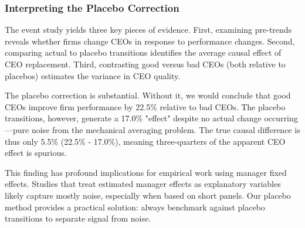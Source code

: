 \documentclass[11pt,a4paper]{article}
\begin{document}
\subsubsection{Interpreting the Placebo Correction}

The event study yields three key pieces of evidence. First, examining pre-trends reveals whether firms change CEOs in response to performance changes. Second, comparing actual to placebo transitions identifies the average causal effect of CEO replacement. Third, contrasting good versus bad CEOs (both relative to placebos) estimates the variance in CEO quality.

The placebo correction is substantial. Without it, we would conclude that good CEOs improve firm performance by 22.5\% relative to bad CEOs. The placebo transitions, however, generate a 17.0\% "effect" despite no actual change occurring—pure noise from the mechanical averaging problem. The true causal difference is thus only 5.5\% (22.5\% - 17.0\%), meaning three-quarters of the apparent CEO effect is spurious.

This finding has profound implications for empirical work using manager fixed effects. Studies that treat estimated manager effects as explanatory variables likely capture mostly noise, especially when based on short panels. Our placebo method provides a practical solution: always benchmark against placebo transitions to separate signal from noise.
\end{document}
